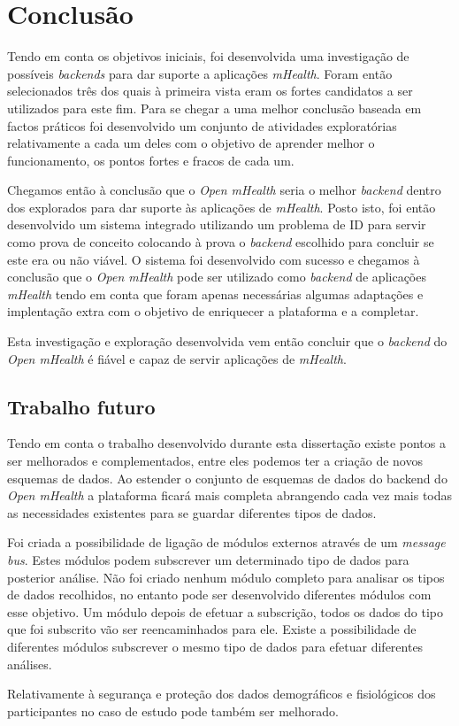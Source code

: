 \chapter{Conclusão}

Tendo em conta os objetivos iniciais, foi desenvolvida uma investigação de possíveis \textit{backends} para dar suporte a aplicações \textit{mHealth}. Foram então selecionados três dos quais à primeira vista eram os fortes candidatos a ser utilizados para este fim. Para se chegar a uma melhor conclusão baseada em factos práticos foi desenvolvido um conjunto de atividades exploratórias relativamente a cada um deles com o objetivo de aprender melhor o funcionamento, os pontos fortes e fracos de cada um. \par 
Chegamos então à conclusão que o \textit{Open mHealth} seria o melhor \textit{backend} dentro dos explorados para dar suporte às aplicações de \textit{mHealth}.
Posto isto, foi então desenvolvido um sistema integrado utilizando um problema de \gls{ID} para servir como prova de conceito colocando à prova o \textit{backend} escolhido para concluir se este era ou não viável.
O sistema foi desenvolvido com sucesso e chegamos à conclusão que o \textit{Open mHealth} pode ser utilizado como \textit{backend} de aplicações \textit{mHealth} tendo em conta que foram apenas necessárias algumas adaptações e implentação extra com o objetivo de enriquecer a plataforma e a completar. \par
Esta investigação e exploração desenvolvida vem então concluir que o \textit{backend} do \textit{Open mHealth} é fiável e capaz de servir aplicações de \textit{mHealth}.


\section{Trabalho futuro}
Tendo em conta o trabalho desenvolvido durante esta dissertação existe pontos a ser melhorados e complementados, entre eles podemos ter a criação de novos esquemas de dados. Ao estender o conjunto de esquemas de dados do backend do \textit{Open mHealth} a plataforma ficará mais completa abrangendo cada vez mais todas as necessidades existentes para se guardar diferentes tipos de dados.\par
Foi criada a possibilidade de ligação de módulos externos através de um \textit{message bus}. Estes módulos podem subscrever um determinado tipo de dados para posterior análise. Não foi criado nenhum módulo completo para analisar os tipos de dados recolhidos, no entanto pode ser desenvolvido diferentes módulos com esse objetivo. Um módulo depois de efetuar a subscrição, todos os dados do tipo que foi subscrito vão ser reencaminhados para ele. Existe a possibilidade de diferentes módulos subscrever o mesmo tipo de dados para efetuar diferentes análises.\par
Relativamente à segurança e proteção dos dados demográficos e fisiológicos dos participantes no caso de estudo pode também ser melhorado.

\cleardoublepage